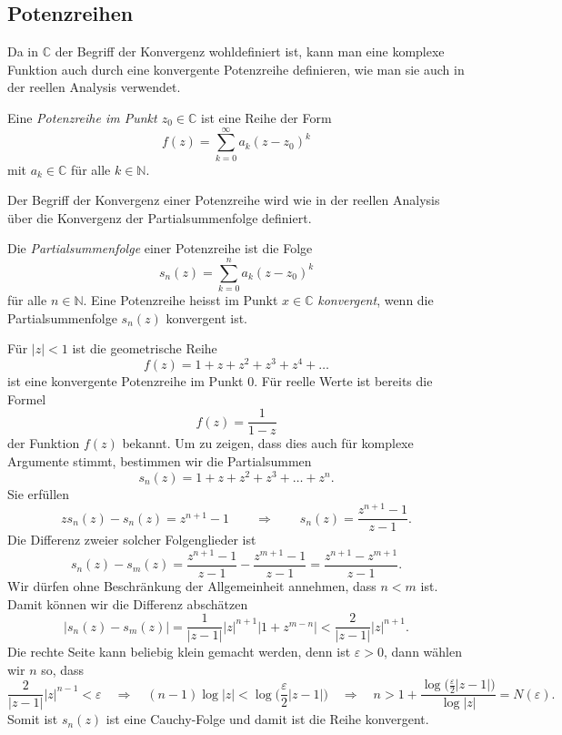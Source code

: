 %
%
%
\subsection{Potenzreihen
\label{buch:komplex:funktionen:subsection:potenzreihen}}
Da in $\mathbb{C}$ der Begriff der Konvergenz wohldefiniert
ist, kann man eine komplexe Funktion auch durch eine konvergente
Potenzreihe definieren, wie man sie auch in der reellen Analysis
verwendet.

\begin{definition}[Potenzreihe]
%
Eine \emph{Potenzreihe im Punkt $z_0\in\mathbb{C}$} ist eine Reihe der
Form
\begin{equation}
f(z)
=
\sum_{k=0}^\infty a_k(z-z_0)^k
\label{buch:komplex:funktionen:eqn:potenzreihe}
\end{equation}
mit $a_k\in\mathbb{C}$ für alle $k\in\mathbb{N}$.
\end{definition}

Der Begriff der Konvergenz einer Potenzreihe wird wie in der
reellen Analysis über die Konvergenz der Partialsummenfolge
definiert.

\begin{definition}
%
%
Die \emph{Partialsummenfolge} einer Potenzreihe ist die Folge
\[
s_n(z)
=
\sum_{k=0}^n a_k(z-z_0)^k
\]
für alle $n\in\mathbb{N}$.
Eine Potenzreihe heisst im Punkt $x\in\mathbb{C}$ \emph{konvergent}, wenn
die Partialsummenfolge $s_n(z)$ konvergent ist.
\end{definition}

\begin{beispiel}
\label{buch:komplex:funktionen:bsp:geometrisch}
Für $|z|<1$ ist die geometrische Reihe
%
%
\[
f(z)
=
1+z+z^2+z^3+z^4+\dots
\]
ist eine konvergente Potenzreihe im Punkt $0$.
Für reelle Werte ist bereits die Formel
\[
f(z)
=
\frac{1}{1-z}
\]
der Funktion $f(z)$ bekannt.
Um zu zeigen, dass dies auch für komplexe Argumente stimmt,
bestimmen wir die Partialsummen
\[
s_n(z)
=
1 + z + z^2 + z^3 + \dots + z^n.
\]
Sie erfüllen
\[
zs_n(z) - s_n(z)
=
z^{n+1}-1
\qquad\Rightarrow\qquad
s_n(z)
=
\frac{z^{n+1}-1}{z-1}.
\]
Die Differenz zweier solcher Folgenglieder ist
\[
s_n(z) - s_m(z)
=
\frac{z^{n+1}-1}{z-1}
-
\frac{z^{m+1}-1}{z-1}
=
\frac{z^{n+1}-z^{m+1}}{z-1}.
\]
Wir dürfen ohne Beschränkung der Allgemeinheit annehmen, dass $n<m$ ist.
Damit können wir die Differenz abschätzen
\[
|s_n(z)-s_m(z)|
=
\frac{1}{|z-1|}
|z|^{n+1} |1+z^{m-n}|
<
\frac{2}{|z-1|}
|z|^{n+1}.
\]
Die rechte Seite kann beliebig klein gemacht werden, denn ist
$\varepsilon>0$, dann wählen wir $n$ so, dass
\[
\frac{2}{|z-1|} |z|^{n-1}
<
\varepsilon
\quad\Rightarrow\quad
(n-1)\log |z|
<
\log\biggl(
\frac{\varepsilon}2 |z-1|
\biggr)
\quad\Rightarrow\quad
n
>
1
+
\frac{
\log \biggl(\frac{\varepsilon}{2}|z-1|\biggr)
}{\log|z|}
=
N(\varepsilon).
\]
Somit ist $s_n(z)$ ist eine Cauchy-Folge und damit ist die Reihe konvergent.
\end{beispiel}


